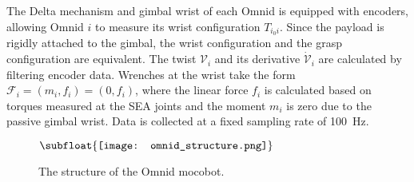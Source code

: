 \documentclass[letterpaper, 10 pt, journal, twoside]{IEEEtran}
\newcommand{\wrench}{{\mathcal F}}
\newcommand{\twist}{{\mathcal V}}
\newcommand{\mass}{{\mathfrak{m}}}
\newcommand{\inertia}{{\mathcal{I}}}
\begin{document}
The Delta mechanism and gimbal wrist of each Omnid is equipped with encoders, allowing Omnid $i$ to measure its wrist configuration $T_{i_0i}$. Since the payload is rigidly attached to the gimbal, the wrist configuration and the grasp configuration are equivalent. The twist $\twist_i$ and its derivative $\dot{\twist}_i$ are calculated by filtering encoder data. Wrenches at the wrist take the form $\wrench_i = (m_i,f_i) = (0,f_i)$, where the linear force $f_i$ is calculated based on torques measured at the SEA joints and the moment $m_i$ is zero due to the passive gimbal wrist. Data is collected at a fixed sampling rate of 100~Hz. 

\begin{figure}
\centering
$\vcenter{\hbox{\subfloat{\texttt{[image: omnid\_structure.png]}}}}$
\caption{The structure of the Omnid mocobot.}
\label{fig:omnid}
\end{figure}




\end{document}
